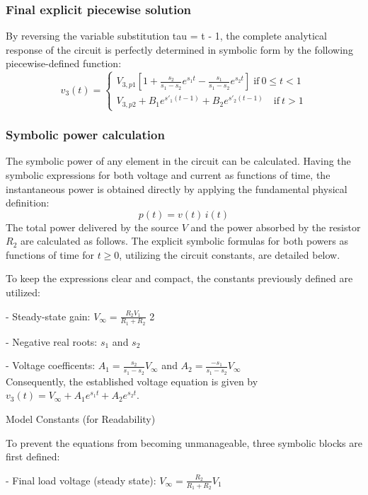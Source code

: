 \documentclass[11pt, a4paper]{article}
\begin{document}
\subsubsection*{Final explicit piecewise solution}

By reversing the variable substitution tau = t - 1, the complete analytical response of the circuit is perfectly determined in symbolic form by the following piecewise-defined function:
\[
 v_3(t) =
\begin{cases}
  V_{3,p1} \left[1+\frac{s_2}{s_1-s_2} e^{s_1t} -  \frac{s_1}{s_1-s_2} e^{s_2t}\right] \; \mathrm{if}\ 0\le t<1  \\
  V_{3,p2} + B_1e^{s'_1(t-1)} + B_2e^{s'_2(t-1)} \quad \mathrm{if}\  t>1
\end{cases}
\]



\subsubsection*{Symbolic power calculation}

The symbolic power of any element in the circuit can be calculated. Having the symbolic expressions for both voltage and current as functions of time, the instantaneous power is obtained directly by applying the fundamental physical definition:
\[
 p(t) = v(t) \, i(t)
 \]
The total power delivered by the source $V$ and the power absorbed by the resistor $R_2$ are calculated as follows. The explicit symbolic formulas for both powers as functions of time for $t \ge 0$, utilizing the circuit constants, are detailed below.

To keep the expressions clear and compact, the constants previously defined are
utilized:

- Steady-state gain: $V_{\infty} = \frac{R_2 V_1}{R_1+R_2}$
2

- Negative real roots: $s_1$ and $s_2$

- Voltage  coefficents: $A_1 = \frac{s_2}{s_1-s_2} V_{\infty}$ and
$A_2 = \frac{-s_1}{s_1-s_2} V_{\infty}$\\
Consequently, the established voltage equation is given by
$v_3 (t) = V_{\infty} + A_1 e^{s_1 t} + A_2 e^{s_2 t}$.

\medskip

Model Constants (for Readability)


To prevent the equations from becoming unmanageable, three symbolic blocks are first defined:

- Final load voltage (steady state): $V_{\infty} = \frac{R_2}{R_1+R_2}V_1$
\end{document}
